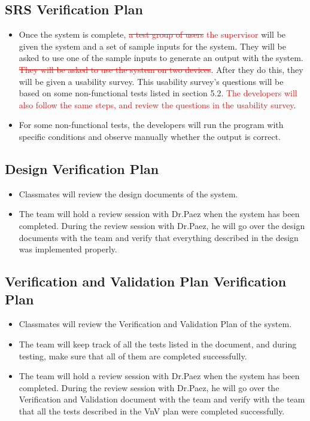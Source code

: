 \documentclass[12pt, titlepage]{article}
\begin{document}
\subsection{SRS Verification Plan}
\label{section:4.2}
\begin{itemize}
    \item Once the system is complete, \textcolor{red}{\sout{a test group of users} the supervisor}  will be given the system and a set of sample inputs for the system. They will be asked to use one of the sample inputs to generate an output with the system. \textcolor{red}{\sout{They will be asked to use the system on two devices}}. After they do this, they will be given a usability survey. This usability survey's questions will be based on some non-functional tests listed in section 5.2. \textcolor{red}{The developers will also follow the same steps, and review the questions in the usability survey}.
    \item For some non-functional tests, the developers will run the program with specific conditions and observe manually whether the output is correct.
\end{itemize}


\subsection{Design Verification Plan}
\label{section:4.3}

\begin{itemize}
    \item Classmates will review the design documents of the system.
    \item The team will hold a review session with Dr.Paez when the system has been completed. During the review session with Dr.Paez, he will go over the design documents with the team and verify that everything described in the design was implemented properly.
\end{itemize}

\subsection{Verification and Validation Plan Verification Plan}
\label{section:4.4}

\begin{itemize}
    \item Classmates will review the Verification and Validation Plan of the system.
    \item The team will keep track of all the tests listed in the document, and during testing, make sure that all of them are completed successfully.
    \item The team will hold a review session with Dr.Paez when the system has been completed. During the review session with Dr.Paez, he will go over the Verification and Validation document with the team and verify with the team that all the tests described in the VnV plan were completed successfully.
\end{itemize}
\end{document}
